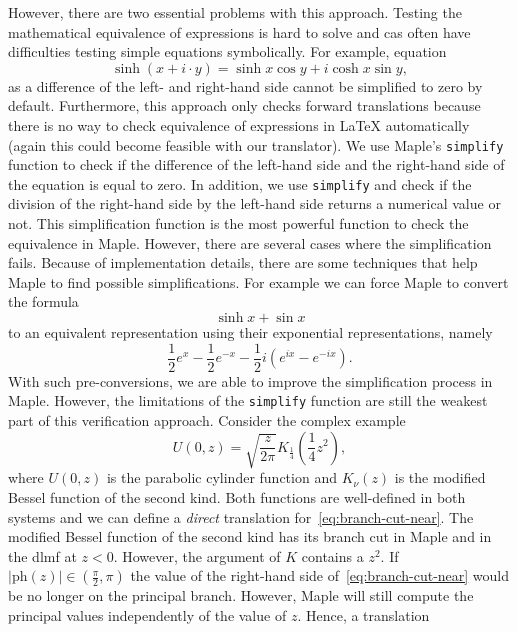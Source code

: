 \documentclass[a4paper,11pt]{article}
\newcommand{\Maple}{Maple}
\theoremstyle{defTheoStyle}
\theoremstyle{defExampStyle}
\DeclareRobustCommand{\cpi}{{\pi}}
\DeclareRobustCommand{\expe}{{e}}
\DeclareRobustCommand{\iunit}{{i}}
\newcommand{\ph}[1]{\mathrm{ph}\!\left(#1\right)}
\begin{document}
However, there are two essential problems with this approach. Testing the mathematical equivalence of expressions is hard to solve and \gls*{cas} often have difficulties testing simple equations symbolically. For example, equation~\parencite[(4.35.34)]{NIST:DLMF}
\begin{equation*}
\sinh \left( x+\iunit \cdot y \right) = \sinh x \cos y + \iunit \cosh x \sin y,
\end{equation*}
as a difference of the left- and right-hand side cannot be simplified to zero by default. Furthermore, this approach only checks forward translations because there is no way to check equivalence of expressions in \LaTeX{} automatically (again this could become feasible with our translator). We use \Maple's \texttt{simplify} function to check if the difference of the left-hand side and the right-hand side of the equation is equal to zero. In addition, we use \texttt{simplify} and check if the division of the right-hand side by the left-hand side returns a numerical value or not. This simplification function is the most powerful function to check the equivalence in \Maple. However, there are several cases where the simplification fails. Because of implementation details, there are some techniques that help \Maple{} to find possible simplifications. For example we can force \Maple{} to convert the formula
\begin{equation}
\sinh{x} + \sin{x}
\end{equation}
to an equivalent representation using their exponential representations, namely
\begin{equation}
\frac{1}{2}\expe^x - \frac{1}{2}\expe^{-x} - \frac{1}{2} \iunit \left( \expe^{\iunit x}-\expe^{-\iunit x} \right).
\end{equation}
With such pre-conversions, we are able to improve the simplification process in \Maple. However, the limitations of the \texttt{simplify} function are still the weakest part of this verification approach. Consider the complex example~\parencite[(12.7.10)]{NIST:DLMF}
\begin{equation}\label{eq:branch-cut-near}
\displaystyle U(0,z) = \sqrt{\frac{z}{2\cpi}} K_{\frac{1}{4}}\left(\frac{1}{4}z^2\right),
\end{equation}
where $U(0,z)$ is the parabolic cylinder function and $K_\nu(z)$ is the modified Bessel function of the second kind. Both functions are well-defined in both systems and we can define a \textit{direct} translation for~\eqref{eq:branch-cut-near}. 
The modified Bessel function of the second kind has its branch cut in \Maple{} and in the \gls*{dlmf} at $z < 0$. However, the argument of $K$ contains a $z^2$. If $|\ph{z}| \in \left(\frac{\cpi}{2}, \cpi\right)$ the value of the right-hand side of~\eqref{eq:branch-cut-near} would be no longer on the principal branch. However, \Maple{} will still compute the principal values independently of the value of $z$. Hence, a translation
\end{document}
